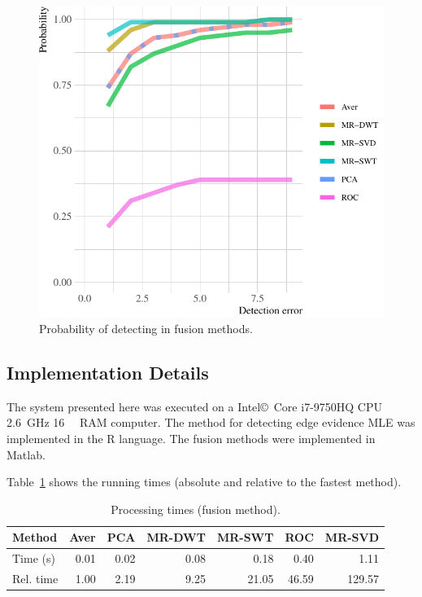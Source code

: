 \documentclass[journal]{IEEEtran}
\begin{document}
\begin{figure}[hbt]
\centering
	\includegraphics[width=.8\linewidth]{metricas_6_fusao_flevoland}
	\caption{Probability of detecting in fusion methods.}
\label{probability_edge_detc}
\end{figure}

\subsection{Implementation Details}

The system presented here was executed on a Intel\copyright\ Core i7-9750HQ CPU \SI{2.6}{\giga\hertz} \SI{16}{\giga\byte} RAM computer.  
The method for detecting edge evidence MLE was implemented in the R language.
The fusion methods were implemented in Matlab. 

Table~\ref{metrica_de_tempo} shows the running times (absolute and relative to the fastest method).

\begin{table}[hbt]
	\centering
	\caption{Processing times (fusion method).}\label{metrica_de_tempo}
	\begin{tabular}{@{}lrrrrrr@{}} \toprule
		Method       & Aver   &   PCA      &  MR-DWT  & MR-SWT &  ROC  &  MR-SVD \\ \midrule
		Time (s)      & 0.01      & 0.02       &  0.08 & 0.18      &  0.40       & 1.11  \\
		Rel. time     & 1.00      & 2.19       &  9.25 & 21.05     &  46.59      & 129.57  \\ \bottomrule
	\end{tabular}
\end{table}
\end{document}
